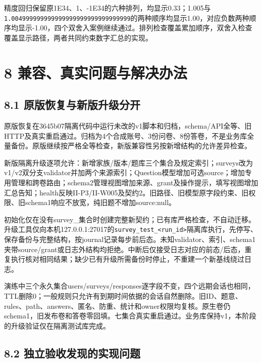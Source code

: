 精度回归保留原1E34、1、-1E34的六种排列，均显示0.33；1.005与\nolinkurl{1.004999999999999999999999999999999}的两种顺序均显示1.00，对应负数两种顺序均显示-1.00，四个双舍入案例继续通过。排列检查覆盖累加顺序，双舍入检查覆盖显示路径，两者共同约束数字汇总的实现。

\section{8 兼容、真实问题与解决办法}\label{ux517cux5bb9ux771fux5b9eux95eeux9898ux4e0eux89e3ux51b3ux529eux6cd5}

\subsection{8.1 原版恢复与新版升级分开}\label{ux539fux7248ux6062ux590dux4e0eux65b0ux7248ux5347ux7ea7ux5206ux5f00}

原版恢复在3645b07隔离代码中运行未改的v1脚本和归档，schema/API全等、旧HTTP及真实重启通过。归档为4个合成账号、3份问卷、8份答卷，不是业务库全量备份。原版继续按严格全等检查，新版兼容性另按新增结构的允许差异检查。

新版隔离升级逐项允许：新增家族/版本/题库三个集合及规定索引；surveys改为v1/v2双分支validator并加两个来源索引；Question模型增加可选source；增加专用管理和跨卷路由；schema2管理视图增加来源、grant及操作提示，填写视图增加汇总告知；health反映II-P3/II-W005及契约2。旧路径、旧模型原字段约束、旧权限、旧schema1响应不放宽，纯旧题不增加source:null。

初始化仅在没有survey\_集合时创建完整新契约；已有库严格检查，不自动迁移。升级工具仅向本机127.0.0.1:27017的\nolinkurl{survey_test_<run_id>}隔离库执行，先停写、保存备份与完整结构，按journal记录每步前后态。未知validator、索引、schema1夹带source/grant或日志外结构均拒绝。中断后仅接受日志对应的前态/后态，重复执行核对相同结果；缺少已有升级所需备份时停止，不重建一个新基线绕过日志。

演练中三个永久集合users/surveys/responses逐字段不变，四个远期会话也相同，TTL删除0；一般规则只允许有到期时间依据的会话自然删除。旧ID、题意、rules、path、answers、匿名、防重、统计和owner权限均复核。原生卷仍schema1，旧发布卷和答卷零回填。七集合真实重启通过。业务库保持v1，本阶段的升级验证仅在隔离测试库完成。

\subsection{8.2 独立验收发现的实现问题}\label{ux72ecux7acbux9a8cux6536ux53d1ux73b0ux7684ux5b9eux73b0ux95eeux9898}

